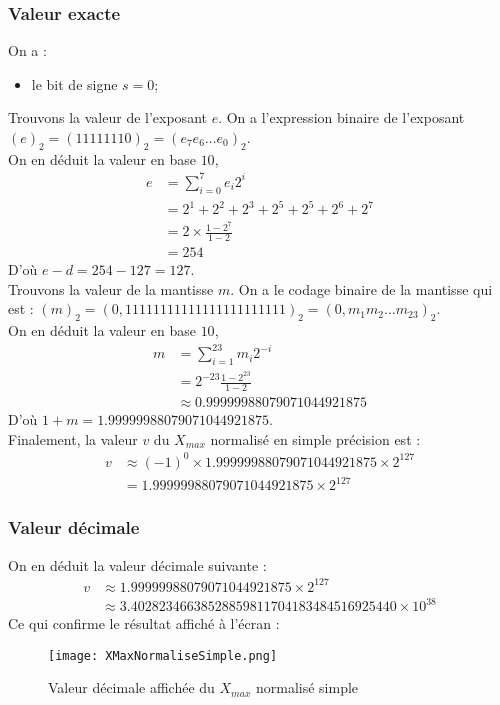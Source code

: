 \documentclass[a4paper, titlepage]{livret} %
\begin{document}
				\subsubsection{Valeur exacte}
					On a : 
					\begin{itemize}
						\item le bit de signe $s = 0$;
					\end{itemize}
					Trouvons la valeur de l'exposant $e$.
					On a l'expression binaire de l'exposant $(e)_{2} = (11111110)_{2} = (e_{7}e_{6}…e_{0})_{2}$.\\
					On en déduit la valeur en base $10$, 
					\[\begin{aligned}
						e & = \sum_{i=0}^{7} e_{i}2^{i}\\
						  & = 2^{1} + 2^{2} + 2^{3}+ 2^{5}+ 2^{5}+ 2^{6} + 2^{7}\\
						  & = 2\times\frac{1 - 2^{7}}{1 - 2}\\
						  & = 254
					\end{aligned}\]
					D'où $e-d = 254 - 127 = 127$.\\
					Trouvons la valeur de la mantisse $m$.
					On a le codage binaire de la mantisse qui est : $(m)_{2} = (0,11111111 11111111 1111111)_{2} = (0,m_{1}m_{2}…m_{23})_{2}$.\\
					On en déduit la valeur en base $10$, 
					\[\begin{aligned}
						m & = \sum_{i=1}^{23} m_{i}2^{-i}\\
						  & = 2^{-23}\frac{1 - 2^{23}}{1 - 2}\\
						  & \approx 0.99999988079071044921875
					\end{aligned}\]
					D'où $1 + m = 1.99999988079071044921875$.\\
					Finalement, la valeur $v$ du $X_{max}$ normalisé en simple précision est :
					\[\begin{aligned}
						v & \approx (-1)^{0} \times 1.99999988079071044921875 \times 2^{127}\\
						  & = 1.99999988079071044921875 \times 2^{127}
					\end{aligned}\]

				\subsubsection{Valeur décimale}
					On en déduit la valeur décimale suivante :
					\[\begin{aligned}
						v & \approx 1.99999988079071044921875 \times 2^{127}\\
						  & \approx 3.40282346638528859811704183484516925440 \times 10^{38}
					\end{aligned}\]
					Ce qui confirme le résultat affiché à l'écran :
					\begin{figure}[!h]
						\centering
  							\texttt{[image: XMaxNormaliseSimple.png]}
  							\caption{Valeur décimale affichée du $X_{max}$ normalisé simple}
					\end{figure}
					\newpage
\end{document}
